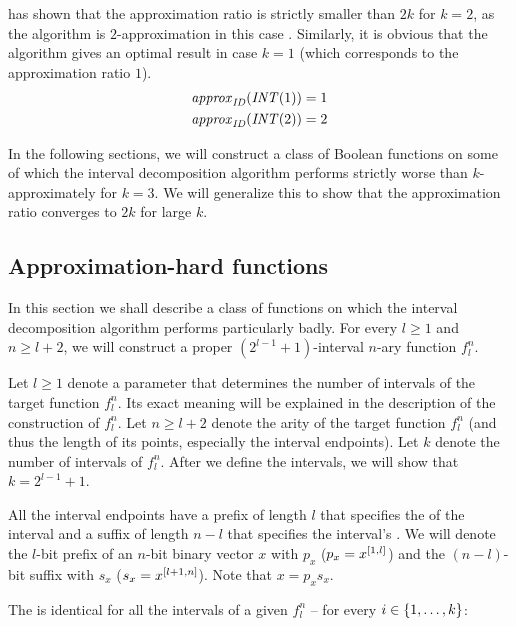 \citeauthor{Dubovsky2012} has shown
that the approximation ratio is strictly smaller than $2k$
for $k = 2$,
as the algorithm is $2$-approximation
in this case \citep[p.~39]{Dubovsky2012}. %
Similarly,
it is obvious that the algorithm
gives an optimal result in case $k = 1$
(which corresponds to the approximation ratio $1$).
\begin{align*}
\mathit{approx}_{\mathit{ID}} (\mathit{INT} (1)) &= 1 \\
\mathit{approx}_{\mathit{ID}} (\mathit{INT} (2)) &= 2
\end{align*}

In the following sections,
we will construct a class of Boolean functions
on some of which
the interval decomposition algorithm
performs strictly worse than $k$-approximately
for $k = 3$.
We will generalize this to show
that the approximation ratio converges to $2k$
for large $k$.

\subsection{Approximation-hard functions}

In this section we shall describe a class of functions
on which the interval decomposition algorithm
performs particularly badly.
For every $l \geq 1$ and $n \geq l+2$,
we will construct
a proper $(2^{l-1} + 1)$-interval $n$-ary function $f_l^n$.

Let $l \geq 1$
denote a parameter that determines the number of intervals of the target function $f_l^n$.
Its exact meaning will be explained in the description of the construction of $f_l^n$.
Let $n \geq l+2$
denote the arity of the target function $f_l^n$
(and thus the length of its points,
especially the interval endpoints).
Let $k$ denote the number of intervals of $f_l^n$.
After we define the intervals,
we will show that $k = 2^{l-1} + 1$.

All the interval endpoints have a prefix of length $l$
that specifies the  of the interval
and a suffix of length $n - l$
that specifies the interval's .
We will denote the $l$-bit  prefix
of an $n$-bit binary vector $x$ with $p_x$
($p_x = x^{[1, l]}$)
and the $(n-l)$-bit  suffix with $s_x$
($s_x = x^{[l+1, n]}$).
Note that $x = p_x s_x$.

The  is identical for all the intervals
of a given $f_l^n$
-- for every $i \in \{1, \ldots, k\}$:

